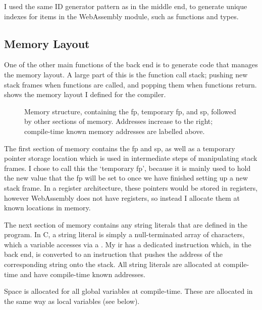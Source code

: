 \documentclass[00-main.tex]{subfiles}
\begin{document}
I used the same ID generator pattern as in the middle end, to generate unique indexes for items in the WebAssembly module, such as functions and types.

\subsection{Memory Layout}

One of the other main functions of the back end is to generate code that manages the memory layout.
A large part of this is the function call stack; pushing new stack frames when functions are called, and popping them when functions return.
 shows the memory layout I defined for the compiler.

\begin{figure}[t]
  \centering
  \caption{\protect{}\protect{}%
    Memory structure, containing the \gls{fp}, temporary \acrlong{fp}, and \gls{sp}, followed by other sections of memory.
    Addresses increase to the right; compile-time known memory addresses are labelled above.
  }%
  \label{fig:memory structure}
\end{figure}


The first section of memory contains the \gls{fp} and \gls{sp}, as well as a temporary pointer storage location which is used in intermediate steps of manipulating stack frames.
I chose to call this the `temporary \acrlong{fp}', because it is mainly used to hold the new value that the \gls{fp} will be set to once we have finished setting up a new stack frame.
In a register architecture, these pointers would be stored in registers, however WebAssembly does not have registers, so instead I allocate them at known locations in memory.

The next section of memory contains any string literals that are defined in the program.
In C, a string literal is simply a null-terminated array of characters, which a variable accesses via a .
My \gls{ir} has a dedicated  instruction which, in the back end, is converted to an instruction that pushes the address of the corresponding string onto the stack.
All string literals are allocated at compile-time and have compile-time known addresses.

Space is allocated for all global variables at compile-time.
These are allocated in the same way as local variables (see  below).
\end{document}
